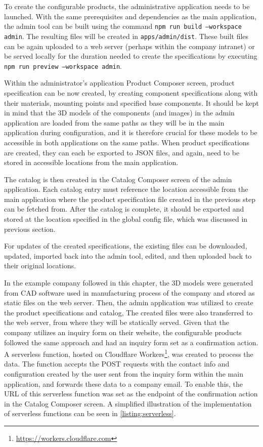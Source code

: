 To create the configurable products, the administrative application needs to be launched. With the same prerequisites and dependencies as the main application, the admin tool can be built using the command \texttt{npm run build --workspace admin}. The resulting files will be created in \texttt{apps/admin/dist}. These built files can be again uploaded to a web server (perhaps within the company intranet) or be served locally for the duration needed to create the specifications by executing \texttt{npm run preview --workspace admin}.

Within the administrator's application Product Composer screen, product specification can be now created, by creating component specifications along with their materials, mounting points and specified base components. It should be kept in mind that the 3D models of the components (and images) in the admin application are loaded from the same paths as they will be in the main application during configuration, and it is therefore crucial for these models to be accessible in both applications on the same paths. When product specifications are created, they can each be exported to JSON files, and again, need to be stored in accessible locations from the main application.

The catalog is then created in the Catalog Composer screen of the admin application. Each catalog entry must reference the location accessible from the main application where the product specification file created in the previous step can be fetched from. After the catalog is complete, it should be exported and stored at the location specified in the global config file, which was discussed in previous section.

For updates of the created specifications, the existing files can be downloaded, updated, imported back into the admin tool, edited, and then uploaded back to their original locations.

In the example company followed in this chapter, the 3D models were generated from CAD software used in manufacturing process of the company and stored as static files on the web server. Then, the admin application was utilized to create the product specifications and catalog, The created files were also transferred to the web server, from where they will be statically served. Given that the company utilizes an inquiry form on their website, the configurable products followed the same approach and had an inquiry form set as a confirmation action. A serverless function, hosted on Cloudflare Workers\footnote{\url{https://workers.cloudflare.com}}, was created to process the data. The function accepts the POST requests with the contact info and configuration created by the user sent from the inquiry form within the main application, and forwards these data to a company email. To enable this, the URL of this serverless function was set as the endpoint of the confirmation action in the Catalog Composer screen. A simplified illustration of the implementation of serverless functions can be seen in \autoref{listing:serverless}.

